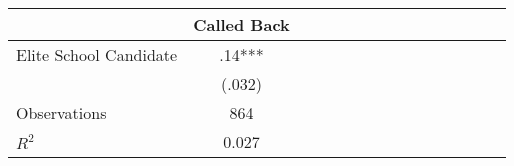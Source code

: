 \begin{tabular}{l*{14}{c}}
                    &\multicolumn{1}{c}{Called Back}\\
\hline
Elite School Candidate&         .14***\\
                    &      (.032)   \\
\hline
Observations        &         864   \\
\(R^{2}\)           &       0.027   \\
\end{tabular}

